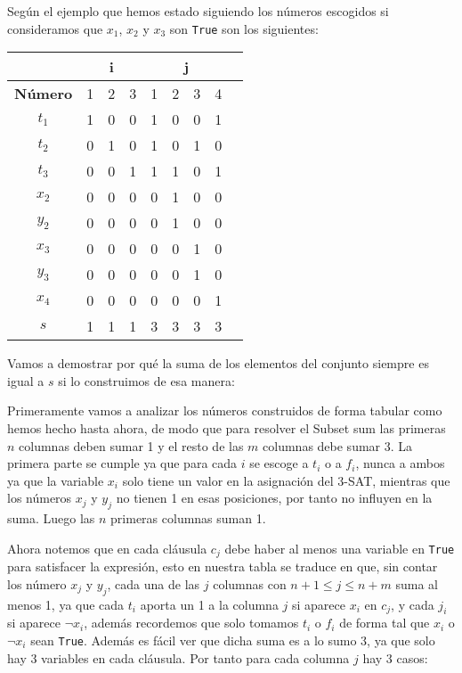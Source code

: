 \documentclass[11pt]{article}
\begin{document}
    Según el ejemplo que hemos estado siguiendo los números escogidos si consideramos que $x_1$, $x_2$ y $x_3$
    son \texttt{True} son los siguientes:

    \begin{table}[!h]
        \centering
        \begin{tabular}{|c|c|c|c|c|c|c|c|c|}
        \hline
        \multicolumn{1}{|c|}{} & \multicolumn{3}{c|}{\textbf{i}} & \multicolumn{4}{c|}{\textbf{j}} \\ \hline
        \textbf{Número} & 1 & 2 & 3 & 1 & 2 & 3 & 4 \\ \hline
        $t_1$ & 1 & 0 & 0 & 1 & 0 & 0 & 1 \\ \hline
        $t_2$ & 0 & 1 & 0 & 1 & 0 & 1 & 0 \\ \hline
        $t_3$ & 0 & 0 & 1 & 1 & 1 & 0 & 1 \\ \hline
        $x_2$ & 0 & 0 & 0 & 0 & 1 & 0 & 0 \\ \hline
        $y_2$ & 0 & 0 & 0 & 0 & 1 & 0 & 0 \\ \hline
        $x_3$ & 0 & 0 & 0 & 0 & 0 & 1 & 0 \\ \hline
        $y_3$ & 0 & 0 & 0 & 0 & 0 & 1 & 0 \\ \hline
        $x_4$ & 0 & 0 & 0 & 0 & 0 & 0 & 1 \\ \hline
        $s$   & 1 & 1 & 1 & 3 & 3 & 3 & 3 \\ \hline
        \end{tabular}
    \end{table}

    Vamos a demostrar por qué la suma de los elementos del conjunto siempre es igual a $s$ si lo construimos
    de esa manera:

    Primeramente vamos a analizar los números construidos de forma tabular como hemos hecho hasta ahora, de modo
    que para resolver el Subset sum las primeras $n$ columnas deben sumar 1 y el resto de las $m$ columnas debe sumar
    3. La primera parte se cumple ya que para cada $i$ se escoge a $t_i$ o a $f_i$, nunca a ambos ya que la variable
    $x_i$ solo tiene un valor en la asignación del 3-SAT, mientras que los números $x_j$ y $y_j$ no tienen 1 en esas
    posiciones, por tanto no influyen en la suma. Luego las $n$ primeras columnas suman 1. 
    
    Ahora notemos que en cada cláusula $c_j$ debe haber al menos una variable en \texttt{True} para satisfacer la expresión, 
    esto en nuestra tabla se traduce en que, sin contar los número $x_j$ y $y_j$, cada una de las $j$ columnas con $n+1 \leq j \leq n+m$
    suma al menos 1, ya que cada $t_i$ aporta un 1 a la columna $j$ si aparece $x_i$ en $c_j$, y cada $j_i$ si aparece $\neg x_i$,
    además recordemos que solo tomamos $t_i$ o $f_i$ de forma tal que $x_i$ o $\neg x_i$ sean \texttt{True}. Además es fácil ver 
    que dicha suma es a lo sumo 3, ya que solo hay 3 variables en cada cláusula. Por tanto para cada columna $j$ hay 3 casos:
\end{document}
